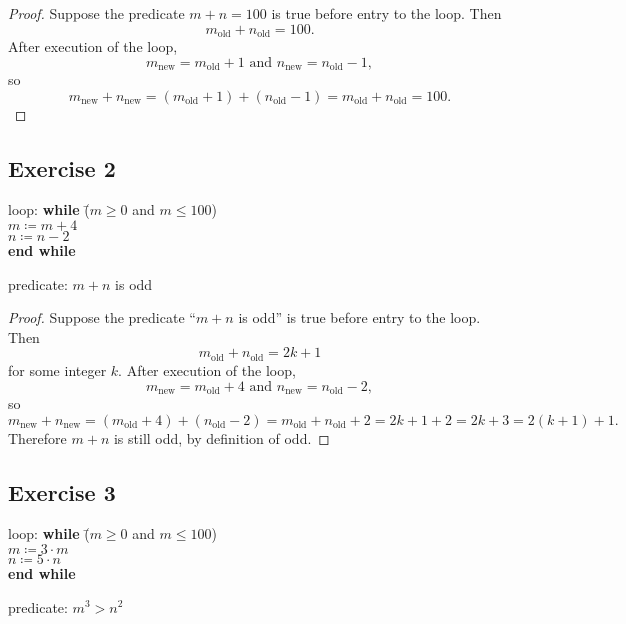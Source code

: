 \documentclass[14pt]{extarticle}
\begin{document}
\begin{proof}
    Suppose the predicate $m + n = 100$ is true before entry to the loop. Then
    \[
        m_{\text{old}} + n_{\text{old}} = 100.
    \]
    After execution of the loop,
    \[
        m_{\text{new}} = m_{\text{old}} + 1 \text{ and } n_{\text{new}} = n_{\text{old}} - 1,
    \]
    so
    \[
        m_{\text{new}} + n_{\text{new}} = (m_{\text{old}} + 1) + (n_{\text{old}} - 1)
        = m_{\text{old}} + n_{\text{old}} = 100.
    \]
\end{proof}

\subsection{Exercise 2}
\begin{tabbing}
    loop: \hspace{1cm}
    \= {\bf while} \= ($m \geq 0$ and $m \leq 100$) \\
    \>             \> $m \coloneqq m + 4$ \\
    \>             \> $n \coloneqq n - 2$ \\
    \> {\bf end while}
\end{tabbing}
predicate: $m + n$ is odd

\begin{proof}
    Suppose the predicate ``$m + n$ is odd'' is true before entry to the loop. Then
    \[
        m_{\text{old}} + n_{\text{old}} = 2k+1
    \]
    for some integer $k$. After execution of the loop,
    \[
        m_{\text{new}} = m_{\text{old}} + 4 \text{ and } n_{\text{new}} = n_{\text{old}} - 2,
    \]
    so
    \[
        m_{\text{new}} + n_{\text{new}} = (m_{\text{old}} + 4) + (n_{\text{old}} - 2)
        = m_{\text{old}} + n_{\text{old}} + 2 = 2k+1 + 2 = 2k+3 = 2(k+1) + 1.
    \]
    Therefore $m+n$ is still odd, by definition of odd.
\end{proof}

\subsection{Exercise 3}
\begin{tabbing}
    loop: \hspace{1cm}
    \= {\bf while} \= ($m \geq 0$ and $m \leq 100$) \\
    \>             \> $m \coloneqq 3 \cdot m$ \\
    \>             \> $n \coloneqq 5 \cdot n$ \\
    \> {\bf end while}
\end{tabbing}
predicate: $m^3 > n^2$
\end{document}
